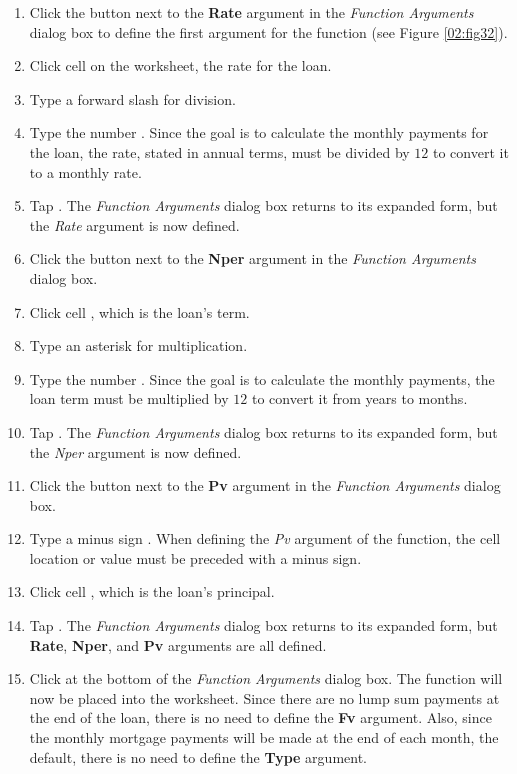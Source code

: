 \begin{enumbox}
	\begin{enumerate}
		\item Click the  button next to the \textbf{Rate} argument in the \textit{Function Arguments} dialog box to define the first argument for the function (see Figure \ref{02:fig32}).
		\item Click cell  on the worksheet, the rate for the loan.
		\item Type a forward slash \fmtTyping{/} for division.
		\item Type the number . Since the goal is to calculate the monthly payments for the loan, the rate, stated in annual terms, must be divided by $ 12 $ to convert it to a monthly rate.
		\item Tap . The \textit{Function Arguments} dialog box returns to its expanded form, but the \textit{Rate} argument is now defined.
		\item Click the  button next to the \textbf{Nper} argument in the \textit{Function Arguments} dialog box. 
		\item Click cell , which is the loan's term.
		\item Type an asterisk \fmtTyping{*} for multiplication.
		\item Type the number . Since the goal is to calculate the monthly payments, the loan term must be multiplied by $ 12 $ to convert it from years to months.
		\item Tap . The \textit{Function Arguments} dialog box returns to its expanded form, but the \textit{Nper} argument is now defined.
		\item Click the  button next to the \textbf{Pv} argument in the \textit{Function Arguments} dialog box.
		\item Type a minus sign \fmtTyping{-}. When defining the \textit{Pv} argument of the  function, the cell location or value must be preceded with a minus sign.
		\item Click cell , which is the loan's principal.
		\item Tap . The \textit{Function Arguments} dialog box returns to its expanded form, but \textbf{Rate}, \textbf{Nper}, and \textbf{Pv} arguments are all defined.
		\item Click  at the bottom of the \textit{Function Arguments} dialog box. The function will now be placed into the worksheet. Since there are no lump sum payments at the end of the loan, there is no need to define the \textbf{Fv} argument. Also, since the monthly mortgage payments will be made at the end of each month, the default, there is no need to define the \textbf{Type} argument.
	\end{enumerate}
\end{enumbox}

